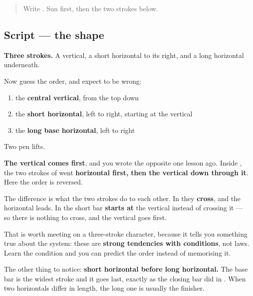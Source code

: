 \label{lesson:ZH-W07-shang}



\begin{quote}
Write . Sun first, then the two strokes below.
\end{quote}

\subsection*{Script — the shape}

\begin{quote}
\end{quote}

\textbf{Three strokes.} A vertical, a short horizontal to its right, and a long horizontal underneath.

Now guess the order, and expect to be wrong:

\begin{enumerate}
\raggedright
  \item the \textbf{central vertical}, from the top down
  \item the \textbf{short horizontal}, left to right, starting at the vertical
  \item the \textbf{long base horizontal}, left to right
\end{enumerate}

Two pen lifts.

\textbf{The vertical comes first}, and you wrote the opposite one lesson ago. Inside , the two strokes of  went \textbf{horizontal first, then the vertical down through it}. Here the order is reversed.

The difference is what the two strokes do to each other. In  they \textbf{cross}, and the horizontal leads. In  the short bar \textbf{starts at} the vertical instead of crossing it — so there is nothing to cross, and the vertical goes first.

That is worth meeting on a three-stroke character, because it tells you something true about the system: these are \textbf{strong tendencies with conditions}, not laws. Learn the condition and you can predict the order instead of memorising it.

The other thing to notice: \textbf{short horizontal before long horizontal.} The base bar is the widest stroke and it goes last, exactly as the closing bar did in . When two horizontals differ in length, the long one is usually the finisher.

